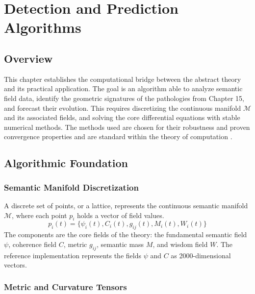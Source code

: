 \chapter{Detection and Prediction Algorithms}

\section{Overview}

This chapter establishes the computational bridge between the abstract theory and its practical application. The goal is an algorithm able to analyze semantic field data, identify the geometric signatures of the pathologies from Chapter 15, and forecast their evolution. This requires discretizing the continuous manifold \(\mathcal{M}\) and its associated fields, and solving the core differential equations with stable numerical methods. The methods used are chosen for their robustness and proven convergence properties and are standard within the theory of computation \autocite{Sipser2012}.

\section{Algorithmic Foundation}

\subsection{Semantic Manifold Discretization}

A discrete set of points, or a lattice, represents the continuous semantic manifold \(\mathcal{M}\), where each point \(p_i\) holds a vector of field values.
\begin{equation}
p_i(t) = \{\psi_i(t), C_i(t), g_{ij}(t), M_i(t), W_i(t)\}
\end{equation}
The components are the core fields of the theory: the fundamental semantic field \(\psi\), coherence field \(C\), metric \(g_{ij}\), semantic mass \(M\), and wisdom field \(W\). The reference implementation represents the fields \(\psi\) and \(C\) as 2000-dimensional vectors.

\subsection{Metric and Curvature Tensors}

